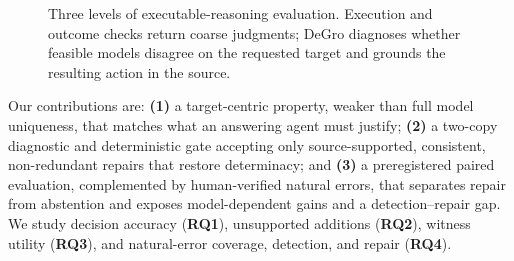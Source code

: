 \documentclass[sigconf,anonymous]{aamas}
\begin{document}
\begin{figure}[t]
\centering
{}
\caption{Three levels of executable-reasoning evaluation.  Execution and outcome checks return coarse judgments; DeGro diagnoses whether feasible models disagree on the requested target and grounds the resulting action in the source.}
\label{fig:paradigms}
\end{figure}

Our contributions are: \textbf{(1)} a target-centric property, weaker than full model uniqueness, that matches what an answering agent must justify; \textbf{(2)} a two-copy diagnostic and deterministic gate accepting only source-supported, consistent, non-redundant repairs that restore determinacy; and \textbf{(3)} a preregistered paired evaluation, complemented by human-verified natural errors, that separates repair from abstention and exposes model-dependent gains and a detection--repair gap.  We study decision accuracy (\textbf{RQ1}), unsupported additions (\textbf{RQ2}), witness utility (\textbf{RQ3}), and natural-error coverage, detection, and repair (\textbf{RQ4}).
\end{document}
